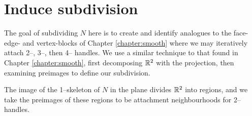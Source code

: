 \section{Induce subdivision}

The goal of subdividing $N$ here is to create and identify analogues to the face- edge- and vertex-blocks of Chapter \ref{chapter:smooth} where we may iteratively attach 2--, 3--, then 4-- handles.
We use a similar technique to that found in Chapter \ref{chapter:smooth}, first decomposing $\mathbb{R}^2$ with the projection, then examining preimages to define our subdivision.

The image of the 1--skeleton of $N$ in the plane divides $\mathbb{R}^2$ into regions, and we take the preimages of these regions to be attachment neighbourhoods for 2--handles.
